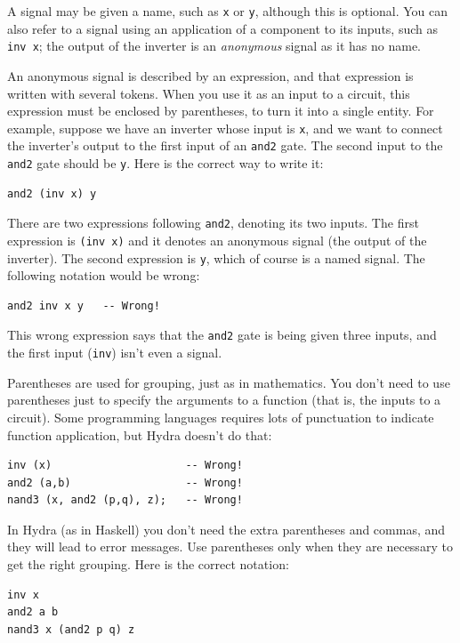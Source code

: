 \documentclass[]{svmono}
\begin{document}
A signal may be given a name, such as \texttt{x} or \texttt{y}, although this is
optional.  You can also refer to a signal using an application of a
component to its inputs, such as \texttt{inv x}; the output of the inverter
is an \emph{anonymous} signal as it has no name.

An anonymous signal is described by an expression, and that expression
is written with several tokens.  When you use it as an input to a
circuit, this expression must be enclosed by parentheses, to turn it
into a single entity.  For example, suppose we have an inverter whose
input is \texttt{x}, and we want to connect the inverter's output to the
first input of an \texttt{and2} gate.  The second input to the \texttt{and2} gate
should be \texttt{y}.  Here is the correct way to write it:

\begin{verbatim}
and2 (inv x) y
\end{verbatim}

There are two expressions following \texttt{and2}, denoting its two inputs.
The first expression is \texttt{(inv x)} and it denotes an anonymous signal
(the output of the inverter).  The second expression is \texttt{y}, which of
course is a named signal.  The following notation would be wrong:

\begin{verbatim}
and2 inv x y   -- Wrong!
\end{verbatim}

This wrong expression says that the \texttt{and2} gate is being given three
inputs, and the first input (\texttt{inv}) isn't even a signal.

Parentheses are used for grouping, just as in mathematics.  You don't
need to use parentheses just to specify the arguments to a function
(that is, the inputs to a circuit).  Some programming languages
requires lots of punctuation to indicate function application, but
Hydra doesn't do that:

\begin{verbatim}
inv (x)                     -- Wrong!
and2 (a,b)                  -- Wrong!
nand3 (x, and2 (p,q), z);   -- Wrong!
\end{verbatim}

In Hydra (as in Haskell) you don't need the extra parentheses and
commas, and they will lead to error messages.  Use parentheses only
when they are necessary to get the right grouping.  Here is the
correct notation:

\begin{verbatim}
inv x
and2 a b
nand3 x (and2 p q) z
\end{verbatim}
\end{document}
